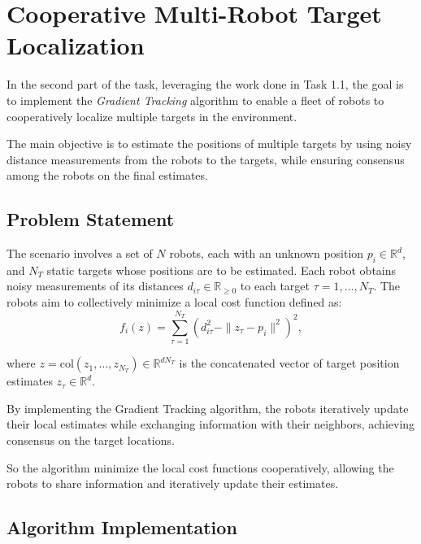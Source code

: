 \section{Cooperative Multi-Robot Target Localization}

In the second part of the task, leveraging the work done in Task 1.1, the goal is to implement the \textit{Gradient Tracking} algorithm to enable a fleet of robots to cooperatively 
localize multiple targets in the environment.

\noindent
The main objective is to estimate the positions of multiple targets by using noisy distance measurements from the robots to the targets, while ensuring consensus among the robots 
on the final estimates.

\subsection{Problem Statement}
The scenario involves a set of \( N \) robots, each with an unknown position \( p_i \in \mathbb{R}^d \), and \( N_T \) static targets whose positions are to be estimated.
\noindent
Each robot obtains noisy measurements of its distances \( d_{i\tau} \in \mathbb{R}_{\geq 0} \) to each target \( \tau = 1, \ldots, N_T \). The robots aim to collectively minimize 
a local cost function defined as: 
\begin{equation}
    f_i(z) = \sum_{\tau=1}^{N_T} \left( d_{i\tau}^2 - \| z_\tau - p_i \|^2 \right)^2,
\end{equation}
    
where \( z = \mathrm{col}(z_1, \ldots, z_{N_T}) \in \mathbb{R}^{d N_T} \) is the concatenated vector of target position estimates \( z_\tau \in \mathbb{R}^d \).

By implementing the Gradient Tracking algorithm, the robots iteratively update their local estimates while exchanging information with their neighbors, achieving consensus on the 
target locations. 

\noindent
So the algorithm minimize the local cost functions cooperatively, allowing the robots to share information and iteratively update their estimates.



\subsection{Algorithm Implementation}


\begin{tcolorbox}[colback=white,colframe=black!75!black,title=ADD IMPLEMENTATION ]

\end{tcolorbox}

